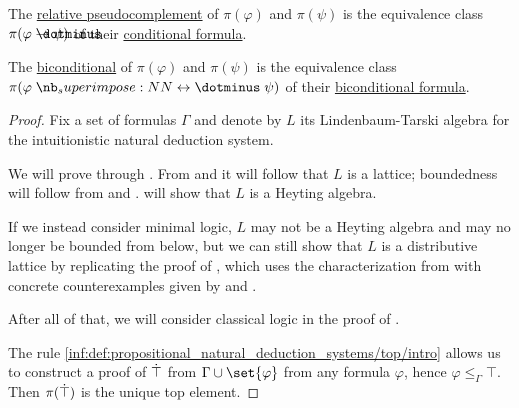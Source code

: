 \begin{proposition}
\begin{thmenum}[resume=thm:lindenbaum_tarski_algebras]
     The \hyperref[def:heyting_algebra]{relative pseudocomplement} of \( \pi(\varphi) \) and \( \pi(\psi) \) is the equivalence class \( \pi(\varphi \synimplies \psi) \) of their \hyperref[def:propositional_alphabet/connectives/conditional]{conditional formula}.

     The \hyperref[def:heyting_algebra/biconditional]{biconditional} of \( \pi(\varphi) \) and \( \pi(\psi) \) is the equivalence class \( \pi(\varphi \syniff \psi) \) of their \hyperref[def:propositional_alphabet/connectives/biconditional]{biconditional formula}.
  \end{thmenum}
\end{proposition}
\begin{proof}
  Fix a set of formulas \( \Gamma \) and denote by \( L \) its Lindenbaum-Tarski algebra for the intuitionistic natural deduction system.

  We will prove  through . From  and  it will follow that \( L \) is a lattice; boundedness will follow from  and .  will show that \( L \) is a Heyting algebra.

  If we instead consider minimal logic, \( L \) may not be a Heyting algebra and may no longer be bounded from below, but we can still show that \( L \) is a distributive lattice by replicating the proof of , which uses the characterization from  with concrete counterexamples given by  and .

  After all of that, we will consider classical logic in the proof of .

   The rule \ref{inf:def:propositional_natural_deduction_systems/top/intro} allows us to construct a proof of \( \dot{\top} \) from \( \Gamma \cup \set{ \varphi } \) from any formula \( \varphi \), hence \( \varphi \leq_\Gamma \top \). Then \( \pi(\dot{\top}) \) is the unique top element.


\end{proof}
